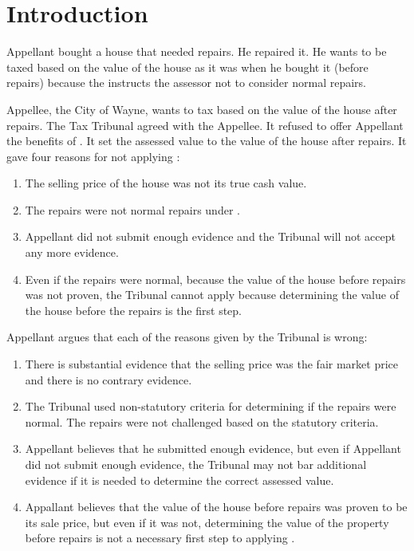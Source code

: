 
\section{Introduction}

Appellant bought a house that needed repairs. He repaired it. He wants to be taxed based on the value of the house as it was when he bought it (before repairs) because the \mathieuGast instructs the assessor not to consider normal repairs. 

Appellee, the City of Wayne, wants to tax based on the value of the house after repairs. The Tax Tribunal agreed with the Appellee. It refused to offer Appellant the benefits of \mathieuGast. It set the assessed value to the value of the house after repairs.
 It gave four reasons for not applying :

\begin{enumerate}
\item The selling price of the house was not its true cash value.

\item The repairs were not normal repairs under .

\item Appellant did not submit enough evidence and the Tribunal will not accept any more evidence.

\item Even if the repairs were normal, because the value of the house before repairs was not proven, the Tribunal cannot apply  because determining the value of the house before the repairs is the first step.

\end{enumerate}

Appellant argues that each of the reasons given by the Tribunal is wrong:

\begin{enumerate}

\item There is substantial evidence that the selling price was the fair market price and there is no contrary evidence.

\item The Tribunal used non-statutory criteria for determining if the repairs were normal. The repairs were not challenged based on the statutory criteria.

\item Appellant believes that he submitted enough evidence, but even if Appellant did not submit enough evidence, the Tribunal may not bar additional evidence if it is needed to determine the correct assessed value.

\item Appallant believes that the value of the house before repairs was proven to be its sale price, but even if it was not, determining the value of the property before repairs is not a necessary first step to applying .

\end{enumerate}




